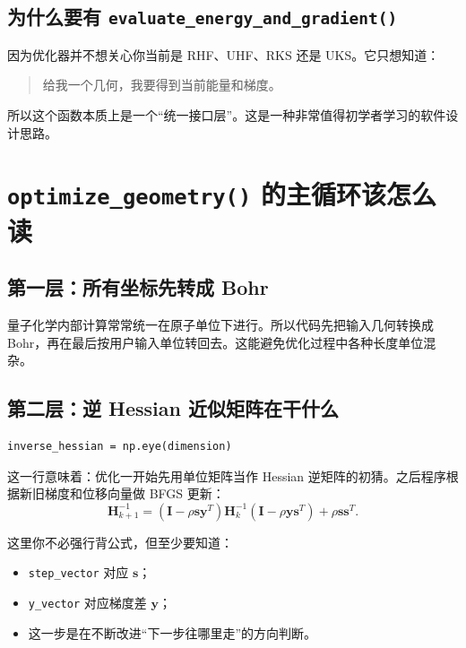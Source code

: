 \documentclass[UTF8,11pt,fontset=fandol]{ctexbook}
\begin{document}


\subsection*{为什么要有 \texttt{evaluate\_energy\_and\_gradient()}}

因为优化器并不想关心你当前是 RHF、UHF、RKS 还是 UKS。它只想知道：
\begin{quote}
给我一个几何，我要得到当前能量和梯度。
\end{quote}

所以这个函数本质上是一个“统一接口层”。这是一种非常值得初学者学习的软件设计思路。

\section{\texttt{optimize\_geometry()} 的主循环该怎么读}



\subsection*{第一层：所有坐标先转成 Bohr}

量子化学内部计算常常统一在原子单位下进行。所以代码先把输入几何转换成 Bohr，再在最后按用户输入单位转回去。这能避免优化过程中各种长度单位混杂。

\subsection*{第二层：逆 Hessian 近似矩阵在干什么}

\begin{lstlisting}[style=pythonstyle]
inverse_hessian = np.eye(dimension)
\end{lstlisting}

这一行意味着：优化一开始先用单位矩阵当作 Hessian 逆矩阵的初猜。之后程序根据新旧梯度和位移向量做 BFGS 更新：
\begin{equation}
\mathbf{H}_{k+1}^{-1}
=
(\mathbf{I}-\rho \mathbf{s}\mathbf{y}^T)
\mathbf{H}_{k}^{-1}
(\mathbf{I}-\rho \mathbf{y}\mathbf{s}^T)
+ \rho \mathbf{s}\mathbf{s}^T.
\end{equation}

这里你不必强行背公式，但至少要知道：
\begin{itemize}
  \item \texttt{step\_vector} 对应 \(\mathbf{s}\)；
  \item \texttt{y\_vector} 对应梯度差 \(\mathbf{y}\)；
  \item 这一步是在不断改进“下一步往哪里走”的方向判断。
\end{itemize}
\end{document}
